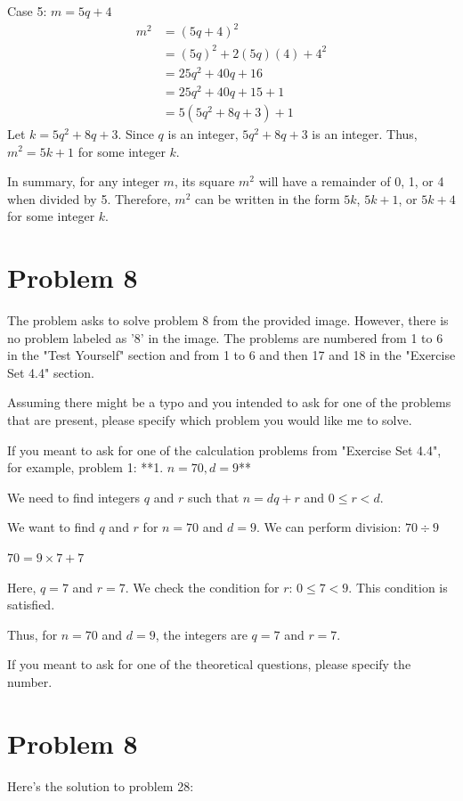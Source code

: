 \documentclass{article}
\begin{document}
Case 5: $m = 5q+4$
\begin{align*} m^2 &= (5q+4)^2 \\ &= (5q)^2 + 2(5q)(4) + 4^2 \\ &= 25q^2 + 40q + 16 \\ &= 25q^2 + 40q + 15 + 1 \\ &= 5(5q^2 + 8q + 3) + 1 \end{align*}
Let $k = 5q^2 + 8q + 3$. Since $q$ is an integer, $5q^2 + 8q + 3$ is an integer. Thus, $m^2 = 5k+1$ for some integer $k$.

In summary, for any integer $m$, its square $m^2$ will have a remainder of 0, 1, or 4 when divided by 5. Therefore, $m^2$ can be written in the form $5k$, $5k+1$, or $5k+4$ for some integer $k$.

\newpage

\section*{Problem 8}
The problem asks to solve problem 8 from the provided image. However, there is no problem labeled as '8' in the image. The problems are numbered from 1 to 6 in the "Test Yourself" section and from 1 to 6 and then 17 and 18 in the "Exercise Set 4.4" section.

Assuming there might be a typo and you intended to ask for one of the problems that are present, please specify which problem you would like me to solve.

If you meant to ask for one of the calculation problems from "Exercise Set 4.4", for example, problem 1:
**1. $n = 70, d = 9$**

We need to find integers $q$ and $r$ such that $n = dq + r$ and $0 \leq r < d$.

We want to find $q$ and $r$ for $n=70$ and $d=9$.
We can perform division:
$70 \div 9$

$70 = 9 \times 7 + 7$

Here, $q = 7$ and $r = 7$.
We check the condition for $r$: $0 \leq 7 < 9$. This condition is satisfied.

Thus, for $n = 70$ and $d = 9$, the integers are $q = 7$ and $r = 7$.

If you meant to ask for one of the theoretical questions, please specify the number.

\newpage

\section*{Problem 8}
Here's the solution to problem 28:
\end{document}
